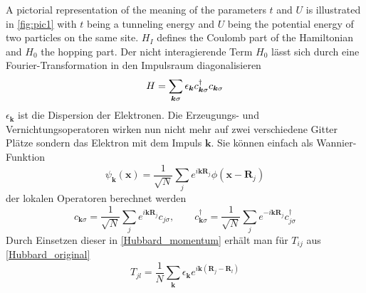 A pictorial representation of the meaning of the parameters $ t $ and $ U $ is illustrated in \ref{fig:pic1} with $t$ being a tunneling energy and $U$ being the potential energy of two particles on the same site. 
$ H_I $ defines the Coulomb part of the Hamiltonian and $H_0$ the hopping part.
Der nicht interagierende Term $ H_0 $ lässt sich durch eine Fourier-Transformation in den Impulsraum diagonalisieren \cite{schoett2014}
\begin{equation}\label{Hubbard_momentum}
H = \sum_{\boldsymbol{k} \sigma} \epsilon_{\boldsymbol{k}} c_{\boldsymbol{k}\sigma}^\dag c_{\boldsymbol{k}\sigma}\\
\end{equation}
$ \epsilon_{\boldsymbol{k}} $ ist die Dispersion der Elektronen. Die Erzeugungs- und Vernichtungsoperatoren wirken nun nicht mehr auf zwei verschiedene Gitter Plätze sondern das Elektron mit dem Impuls $ \boldsymbol{k} $. Sie können einfach als Wannier-Funktion
\begin{equation}\label{Wannier}
\psi_{\boldsymbol{k}} \left( \boldsymbol{x}\right) = \frac{1}{\sqrt{N}}\sum_{j} e^{i\boldsymbol{k}\boldsymbol{R}_j} \phi(\boldsymbol{x}-\boldsymbol{R}_j)
\end{equation} 
der lokalen Operatoren berechnet werden
\begin{equation}\label{c_momentum}
c_{\boldsymbol{k}\sigma} = \frac{1}{\sqrt{N}}\sum_{j} e^{i\boldsymbol{k}\boldsymbol{R}_j} c_{j\sigma}, \qquad c_{\boldsymbol{k}\sigma}^\dagger = \frac{1}{\sqrt{N}}\sum_{j} e^{-i\boldsymbol{k}\boldsymbol{R}_j} c_{j\sigma}^\dagger
\end{equation}\cite{Hubbard}  
Durch Einsetzen dieser in \eqref{Hubbard_momentum} erhält man für $ T_{ij} $ aus \eqref{Hubbard_original}
\begin{equation}\label{T}
T_{jl} = \frac{1}{N} \sum_{\boldsymbol{k}}\epsilon_{\boldsymbol{k}} e^{i\boldsymbol{k}\left( \boldsymbol{R}_j - \boldsymbol{R}_l\right) }
\end{equation}

